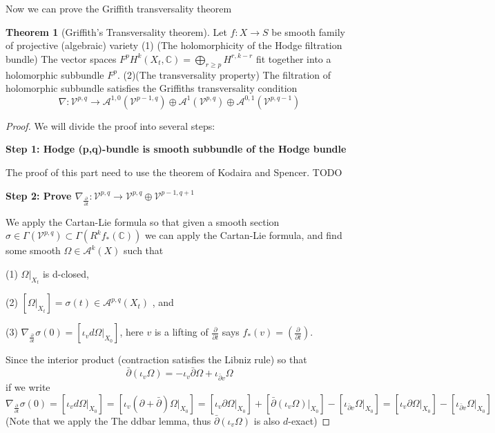 \documentclass[11pt]{article}
\theoremstyle{definition}
\newtheorem{theorem}{Theorem}[section]
\begin{document}
	Now we can prove the Griffith transversality theorem
	\begin{theorem}[Griffith's Transversality theorem]
		Let $f:X\to S$ be smooth family of projective (algebraic) variety 
		(1) (The holomorphicity of the Hodge filtration bundle) The vector spaces $F^pH^k(X_t, \mathbb{C}) = \bigoplus_{r\ge p}{H}^{r,k-r}$ fit together into a holomorphic subbundle $F^p$.
		(2)(The transversality property) The filtration of holomorphic subbundle satisfies the Griffiths transversality condition
		$$\nabla : \mathcal{V}^{p,q}\to \mathcal{A}^{1,0}(\mathcal{V}^{p-1,q})\oplus \mathcal{A}^{1}(\mathcal{V}^{p,q})\oplus \mathcal{A}^{0,1}(\mathcal{V}^{p,q-1})$$	
	\end{theorem}
	\begin{proof}
	We will divide the proof into several steps:
	
	\textbf{Step 1: Hodge (p,q)-bundle is smooth subbundle of the Hodge bundle}
	
	The proof of this part need to use the theorem of Kodaira and Spencer. TODO
	
	\textbf{Step 2: Prove $\nabla _{\frac{\partial }{\partial  t}}: \mathcal{V}^{p,q}\to \mathcal{V}^{p,q}\oplus \mathcal{V}^{p-1,q+1}$ }
	
	We apply the Cartan-Lie formula so that given a smooth section $\sigma \in \Gamma(\mathcal{V}^{p,q})\subset  \Gamma(R^kf_* (\mathbb{C}))$ we can apply the Cartan-Lie formula, and find some smooth $\Omega \in \mathcal{A}^{k}(X)$ such that
	
	(1) $\Omega|_{X_t}$ is d-closed,
	
	(2) $[\Omega|_{X_t}] = \sigma(t) \in \mathcal{A}^{p,q}(X_t)$ , and 
	
	(3) $\nabla_{\frac{\partial }{\partial t}} \sigma (0 ) =  [\iota_v d \Omega|_{X_0}]$, here $v$ is a lifting of $\frac{\partial }{\partial t}$ says $f_* (v) =  \left(\frac{\partial }{\partial t}\right)$.
	
	Since the interior product (contraction satisfies the Libniz rule) so that $$\bar{\partial} (\iota_v \Omega) =  - \iota_v  \bar{\partial}\Omega +  \iota_{ \bar{\partial} v} \Omega$$if we write $$ \nabla _{\frac{\partial  }{\partial t}}  \sigma(0) = [\iota_v d \Omega |_{X_0}] = [\iota_v  (\partial+ \bar{\partial} )\Omega|_{X_0}] =  [\iota_v  \partial \Omega |_{X_0}] + [\bar{\partial} (\iota_v \Omega)|_{X_0} ]-  [\iota_{\bar{\partial} v} \Omega|_{X_0}]  =  [\iota_v \partial \Omega|_{X_0} ] - [\iota_{\bar{\partial} v}\Omega|_{X_0}]$$
	(Note that we apply the The ddbar lemma, thus $\bar{\partial}(\iota_v \Omega)$ is also $d$-exact)
	

\end{proof}
\end{document}
